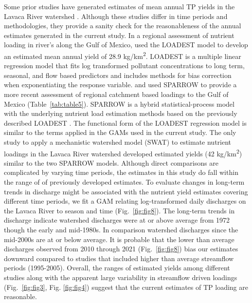 \documentclass[fleqn,10pt,lineno]{wlpeerj} %
\begin{document}
Some prior studies have generated estimates of mean annual TP yields in
the Lavaca River watershed
\autocites[Table~\ref{tab:table5},][]{dunnTrendsNutrientInflows1996,rebichSourcesDeliveryNutrients2011,omaniEstimationSedimentNutrient2014,wise_spatially_2019}.
Although these studies differ in time periods and methodologies, they
provide a sanity check for the reasonableness of the annual estimates
generated in the current study. In a regional assessment of nutrient
loading in river's along the Gulf of Mexico,
\textcite{dunnTrendsNutrientInflows1996} used the LOADEST model to
develop an estimated mean annual yield of 28.9 kg/km\textsuperscript{2}.
LOADEST is a multiple linear regression model that fits log transformed
pollutant concentrations to long term, seasonal, and flow based
predictors and includes methods for bias correction when exponentiating
the response variable. \textcite{rebichSourcesDeliveryNutrients2011} and
\textcite{wise_spatially_2019} used SPARROW to provide a more recent
assessment of regional catchment based loadings to the Gulf of Mexico
(Table~\ref{tab:table5}). SPARROW is a hybrid statistical-process model
with the underlying nutrient load estimation methods based on the
previously described LOADEST
\autocite{schwarzSPARROWSurfaceWaterQuality2006}. The functional form of
the LOADEST regression model is similar to the terms applied in the GAMs
used in the current study. The only study to apply a mechanistic
watershed model (SWAT) to estimate nutrient loadings in the Lavaca River
watershed \textcite{omaniEstimationSedimentNutrient2014} developed
estimated yields (42 kg/km\textsuperscript{2}) similar to the two
SPARROW models. Although direct comparisons are complicated by varying
time periods, the estimates in this study do fall within the range of of
previously developed estimates. To evaluate changes in long-term trends
in discharge might be associated with the nutrient yield estimates
covering different time periods, we fit a GAM relating log-transformed
daily discharges on the Lavaca River to season and time
(Fig.~\ref{fig:fig8}). The long-term trends in discharge indicate
watershed discharges were at or above average from 1972 though the early
and mid-1980s. In comparison watershed discharges since the mid-2000s
are at or below average. It is probable that the lower than average
discharges observed from 2010 through 2021 (Fig.~\ref{fig:fig8}) bias
our estimates downward compared to studies that included higher than
average streamflow periods (1995-2005). Overall, the ranges of estimated
yields among different studies along with the apparent large variability
in streamflow driven loadings (Fig.~\ref{fig:fig3}, Fig. \ref{fig:fig4})
suggest that the current estimates of TP loading are reasonable.
\end{document}
